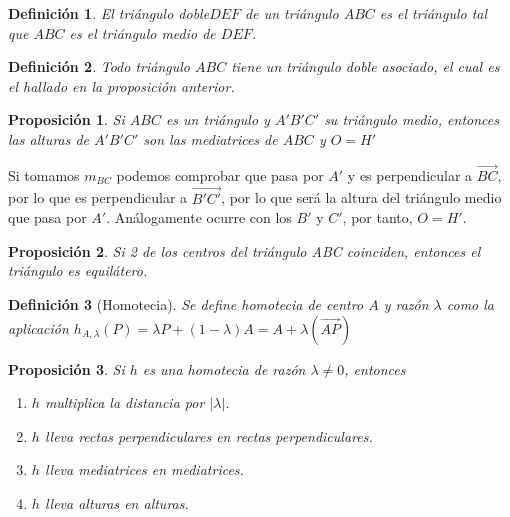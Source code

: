 \documentclass[11pt, a4paper]{article}
\makeatletter
\newif\IfInSansMode
\let\oldsf\sffamily
\renewcommand*{\sffamily}{\oldsf\mathversion{sans}\InSansModetrue}
\let\oldnorm\normalfont
\renewcommand*{\normalfont}{\oldnorm\InSansModefalse\mathversion{normal}}
\renewenvironment{proof}[1][\proofname] {\vspace{-15pt}\par\pushQED{\qed}\normalfont\topsep6\p@\@plus6\p@\relax\trivlist\item[\hskip\labelsep\it#1\@addpunct{.}]\ignorespaces}{\popQED\endtrivlist\@endpefalse}
\renewcommand{\vec}{\overrightarrow}
\renewenvironment{proof}[1][\proofname] {\par\pushQED{\qed}\normalfont\topsep6\p@\@plus6\p@\relax\trivlist\item[\hskip\labelsep\itshape\sffamily#1\@addpunct{.}]\ignorespaces}{\popQED\endtrivlist\@endpefalse}
\theoremstyle{theorem-style}
\newtheorem{nprop}{Proposición}[section]
\theoremstyle{definition-style}
\newtheorem{ndef}{Definición}[section]
\theoremstyle{remark-style}
\theoremstyle{example-style}
\makeatother
\begin{document}
\begin{ndef}
  El triángulo doble$DEF$ de un triángulo $ABC$ es el triángulo tal que $ABC$ es el triángulo medio de $DEF$.
\end{ndef}

\begin{ndef}
  Todo triángulo $ABC$ tiene un triángulo doble asociado, el cual es el hallado en la proposición anterior.
\end{ndef}


\begin{nprop}
  Si $ABC$ es un triángulo y $A'B'C'$ su triángulo medio, entonces las alturas de $A'B'C'$ son las mediatrices de $ABC$ y $O=H'$
\end{nprop}
\begin{proof}
  Si tomamos $m_{BC}$ podemos comprobar que pasa por $A'$ y es perpendicular a $\vec{BC}$, por lo que es perpendicular a $\vec{B'C'}$, por lo que será la altura del triángulo medio que pasa por $A'$. Análogamente ocurre con los $B'$ y $C'$, por tanto, $O=H'$.
\end{proof}


\begin{nprop}Si 2 de los centros del triángulo ABC coinciden, entonces el triángulo es equilátero.
\end{nprop}


\begin{ndef}[Homotecia]
  Se define homotecia de centro $A$ y razón $\lambda$ como la aplicación $h_{A,\lambda}(P) = \lambda P + (1-\lambda)A = A+\lambda(\vec{AP})$
\end{ndef}

\begin{nprop} Si $h$ es una homotecia de razón $\lambda\ne 0$, entonces 
\begin{enumerate}
\item $h$ multiplica la distancia por $|\lambda|$.
\item $h$ lleva rectas perpendiculares en rectas perpendiculares.
\item $h$ lleva mediatrices en mediatrices.
\item $h$ lleva alturas en alturas.
\end{enumerate}
\end{nprop}
\end{document}
